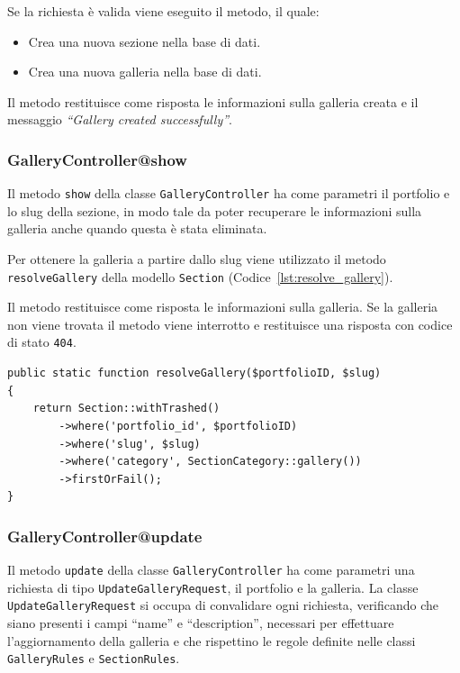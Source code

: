 Se la richiesta \`e valida viene eseguito il metodo, il quale:
\begin{itemize}
	\item Crea una nuova sezione nella base di dati.
	\item Crea una nuova galleria nella base di dati.
\end{itemize} 

Il metodo restituisce come risposta le informazioni sulla galleria creata e il messaggio \textit{``Gallery created successfully''}.

\subsubsection{GalleryController@show}
Il metodo \verb|show| della classe \verb|GalleryController| ha come parametri il portfolio e lo slug della sezione, in modo tale da poter recuperare le informazioni sulla galleria anche quando questa \`e stata eliminata.

Per ottenere la galleria a partire dallo slug viene utilizzato il metodo \verb|resolveGallery| della modello \verb|Section| (Codice~\ref{lst:resolve_gallery}).

Il metodo restituisce come risposta le informazioni sulla galleria. Se la galleria non viene trovata il metodo viene interrotto e restituisce una risposta con codice di stato \verb|404|.

\begin{lstlisting}[caption={Metodo per ottenere la galleria a partire dallo slug}, label={lst:resolve_gallery}]
public static function resolveGallery($portfolioID, $slug)
{
	return Section::withTrashed()
		->where('portfolio_id', $portfolioID)
		->where('slug', $slug)
		->where('category', SectionCategory::gallery())
		->firstOrFail();
}
\end{lstlisting}

\subsubsection{GalleryController@update}
Il metodo \verb|update| della classe \verb|GalleryController| ha come parametri una richiesta di tipo \verb|UpdateGalleryRequest|, il portfolio e la galleria. La classe \verb|UpdateGalleryRequest| si occupa di convalidare ogni richiesta, verificando che siano presenti i campi ``name'' e ``description'', necessari per effettuare l'aggiornamento della galleria e che rispettino le regole definite nelle classi \verb|GalleryRules| e \verb|SectionRules|.

